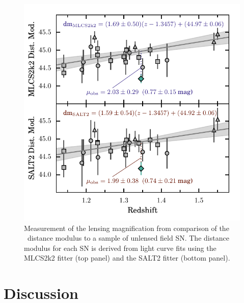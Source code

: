 \begin{figure}
\begin{center}
\includegraphics[width=\columnwidth]{FIG/snTomas_hubble_diagram}
\caption{ Measurement of the lensing magnification from comparison of
the \tomas\ distance modulus to a sample of unlensed field SN.
The distance modulus for each SN is derived from light curve fits
using the MLCS2k2 fitter (top panel) and the SALT2 fitter (bottom panel).
\label{fig:MagnificationMeasurement} }
\end{center}
\end{figure}


\section{Discussion}
\label{sec:Discussion}


